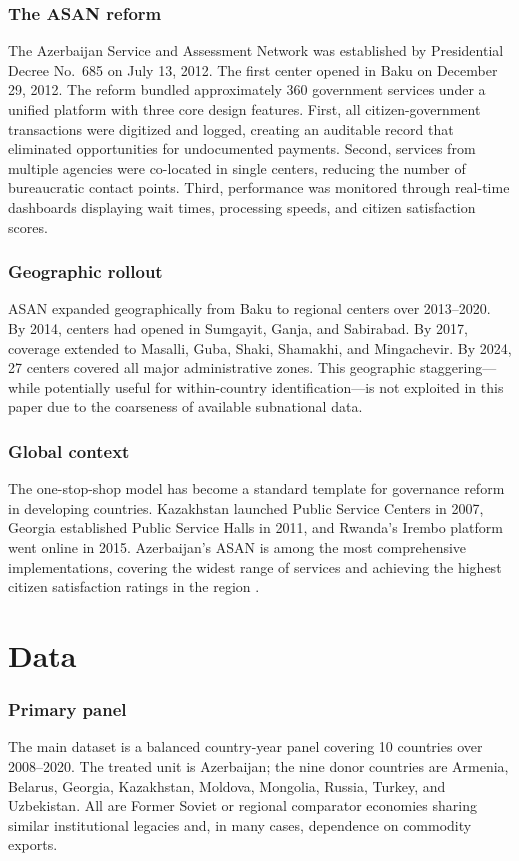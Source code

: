 \documentclass[12pt]{article}
\begin{document}
\subsubsection*{The ASAN reform} The Azerbaijan Service and Assessment Network was established by Presidential Decree No.~685 on July 13, 2012. The first center opened in Baku on December 29, 2012. The reform bundled approximately 360 government services under a unified platform with three core design features. First, all citizen-government transactions were digitized and logged, creating an auditable record that eliminated opportunities for undocumented payments. Second, services from multiple agencies were co-located in single centers, reducing the number of bureaucratic contact points. Third, performance was monitored through real-time dashboards displaying wait times, processing speeds, and citizen satisfaction scores.

\subsubsection*{Geographic rollout} ASAN expanded geographically from Baku to regional centers over 2013--2020. By 2014, centers had opened in Sumgayit, Ganja, and Sabirabad. By 2017, coverage extended to Masalli, Guba, Shaki, Shamakhi, and Mingachevir. By 2024, 27 centers covered all major administrative zones. This geographic staggering---while potentially useful for within-country identification---is not exploited in this paper due to the coarseness of available subnational data.

\subsubsection*{Global context} The one-stop-shop model has become a standard template for governance reform in developing countries. Kazakhstan launched Public Service Centers in 2007, Georgia established Public Service Halls in 2011, and Rwanda's Irembo platform went online in 2015. Azerbaijan's ASAN is among the most comprehensive implementations, covering the widest range of services and achieving the highest citizen satisfaction ratings in the region \citep{undesa2014egovernment}.


\section{Data}

\subsubsection*{Primary panel} The main dataset is a balanced country-year panel covering 10 countries over 2008--2020. The treated unit is Azerbaijan; the nine donor countries are Armenia, Belarus, Georgia, Kazakhstan, Moldova, Mongolia, Russia, Turkey, and Uzbekistan. All are Former Soviet or regional comparator economies sharing similar institutional legacies and, in many cases, dependence on commodity exports.
\end{document}
